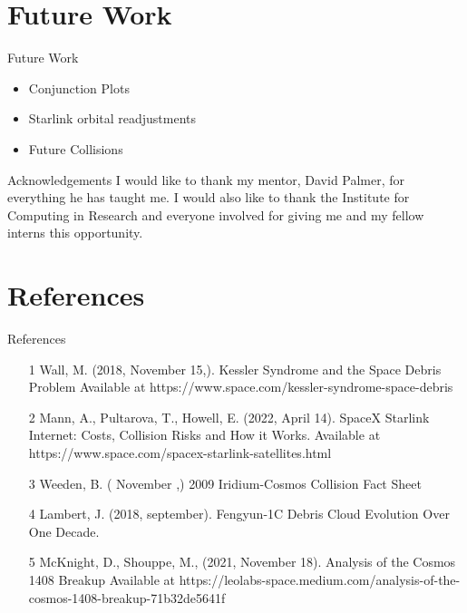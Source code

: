 \documentclass{beamer}
\begin{document}
\section{Future Work}
\begin{frame}{Future Work}
\begin{itemize}
\item Conjunction Plots
\item Starlink orbital readjustments
\item Future Collisions
\end{itemize}
\end{frame}

\begin{frame}{Acknowledgements}
I would like to thank my mentor, David Palmer, for everything he has taught me.
\vfill
I would also like to thank the Institute for Computing in Research and everyone involved for giving me and my fellow interns this opportunity.
\end{frame}

\section{References}
\begin{frame}{References}
\begin{itemize}
\item [1] Wall, M. (2018, November 15,). Kessler Syndrome and the Space Debris Problem Available at https://www.space.com/kessler-syndrome-space-debris
\item [2] Mann, A., Pultarova, T.,  Howell, E. (2022, April 14). SpaceX Starlink Internet: Costs, Collision Risks and How it Works. Available at https://www.space.com/spacex-starlink-satellites.html
\item [3] Weeden, B. ( November ,) 2009 Iridium-Cosmos Collision Fact Sheet %
\item [4] Lambert, J. (2018, september). Fengyun-1C Debris Cloud Evolution Over One Decade. %
\item [5] McKnight, D., Shouppe, M., (2021, November 18). Analysis of the Cosmos 1408 Breakup Available at https://leolabs-space.medium.com/analysis-of-the-cosmos-1408-breakup-71b32de5641f
\end{itemize}
\end{frame}
\end{document}
